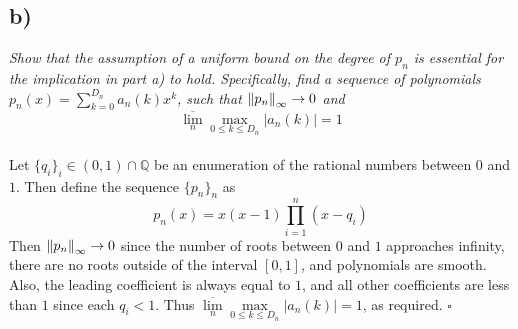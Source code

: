 \documentclass[12pt]{article}
\begin{document}
\subsection*{ b)}
{\it Show that the assumption of a uniform bound on the degree of $p_n$ is essential for the implication in part a) to hold.  Specifically, find a sequence of polynomials $p_n(x) = \sum_{k=0}^{D_n}a_n(k)x^k$, such that $\norm{p_n}_\infty \rightarrow 0$ and}
\begin{equation}
	\label{problem_7b_condition}
	\overline{\lim_n} \max_{0\leq k \leq D_n} |a_n(k)| = 1
\end{equation} \\

Let $\{q_i\}_i \in (0,1)\cap\mathbb{Q}$ be an enumeration of the rational numbers between $0$ and $1$.  Then define the sequence $\{p_n\}_n$ as
\begin{equation*}
  p_n(x) = x(x - 1)\prod\limits_{i=1}^{n}(x - q_i)
\end{equation*}
Then $\norm{p_n}_\infty \rightarrow 0$ since the number of roots between $0$ and $1$ approaches infinity, there are no roots outside of the interval $[0,1]$, and polynomials are smooth.  Also, the leading coefficient is always equal to $1$, and all other coefficients are less than $1$ since each $q_i < 1$.  Thus $\overline{\lim\limits_n}\max\limits_{0\leq k\leq D_n} |a_n(k)| = 1$, as required. \hfill $\square$
\end{document}
